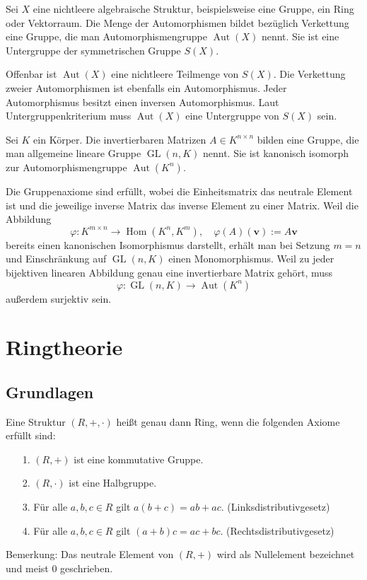 \begin{Satz}
Sei $X$ eine nichtleere algebraische Struktur, beispielsweise eine
Gruppe, ein Ring oder Vektorraum. Die Menge der Automorphismen bildet
bezüglich Verkettung eine Gruppe, die man Automorphismengruppe
$\operatorname{Aut}(X)$ nennt. Sie ist eine Untergruppe der
symmetrischen Gruppe $S(X)$.  
\end{Satz}
\begin{Beweis}
Offenbar ist $\operatorname{Aut}(X)$ eine nichtleere Teilmenge von
$S(X)$. Die Verkettung zweier Automorphismen ist ebenfalls ein
Automorphismus. Jeder Automorphismus besitzt einen inversen
Automorphismus. Laut Untergruppenkriterium muss $\operatorname{Aut}(X)$
eine Untergruppe von $S(X)$ sein.\,\qedsymbol
\end{Beweis}

\begin{Satz}
Sei $K$ ein Körper. Die invertierbaren Matrizen $A\in K^{n\times n}$
bilden eine Gruppe, die man allgemeine lineare Gruppe
$\operatorname{GL}(n,K)$ nennt. Sie ist kanonisch isomorph zur
Automorphismengruppe $\operatorname{Aut}(K^n)$.
\end{Satz}
\begin{Beweis}
Die Gruppenaxiome sind erfüllt, wobei die Einheitsmatrix das
neutrale Element ist und die jeweilige inverse Matrix das
inverse Element zu einer Matrix. Weil die Abbildung%
\[\varphi\colon K^{m\times n}\to\operatorname{Hom}(K^n,K^m),\quad
\varphi(A)(\mathbf v) := A\mathbf v\]
bereits einen kanonischen Isomorphismus darstellt, erhält man bei
Setzung $m=n$ und Einschränkung auf $\operatorname{GL}(n,K)$
einen Monomorphismus. Weil zu jeder bijektiven linearen Abbildung genau
eine invertierbare Matrix gehört, muss%
\[\varphi\colon\operatorname{GL}(n,K)\to\operatorname{Aut}(K^n)\]
außerdem surjektiv sein.\,\qedsymbol
\end{Beweis}

\newpage
\section{Ringtheorie}

\subsection{Grundlagen}

\begin{Definition}[Ring]
Eine Struktur $(R,+,\cdot)$ heißt genau dann Ring, wenn die folgenden
Axiome erfüllt sind:
\begin{enumerate}
\item[1.] $(R,+)$ ist eine kommutative Gruppe.
\item[2.] $(R,\cdot)$ ist eine Halbgruppe.
\item[3.] Für alle $a,b,c\in R$ gilt $a(b+c) = ab+ac$. (Linksdistributivgesetz)
\item[4.] Für alle $a,b,c\in R$ gilt $(a+b)c = ac+bc$. (Rechtsdistributivgesetz)
\end{enumerate}
\end{Definition}
Bemerkung: Das neutrale Element von $(R,+)$ wird als Nullelement
bezeichnet und meist $0$ geschrieben.

